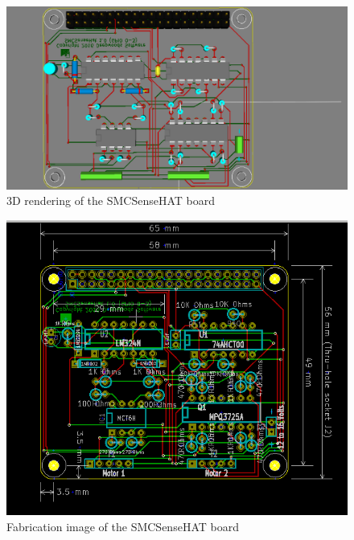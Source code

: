 \begin{figure}[hbpt]\begin{centering}%
\includegraphics[width=5in]{SMCSenseHAT3DTop.png}
\caption{3D rendering of the SMCSenseHAT board}
\end{centering}\end{figure}
\begin{figure}[hbpt]\begin{centering}%
\includegraphics[width=5in]{SMCSenseHAT.png}
\caption{Fabrication image of the SMCSenseHAT board}
\end{centering}\end{figure}


